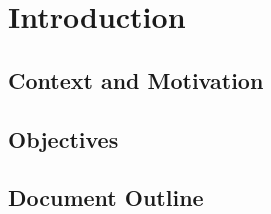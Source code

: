 \chapter{Introduction} \label{chap:intro}

\section*{}

\section{Context and Motivation} \label{sec:context}

\section{Objectives} \label{sec:goals}

\section{Document Outline} \label{sec:outline}
